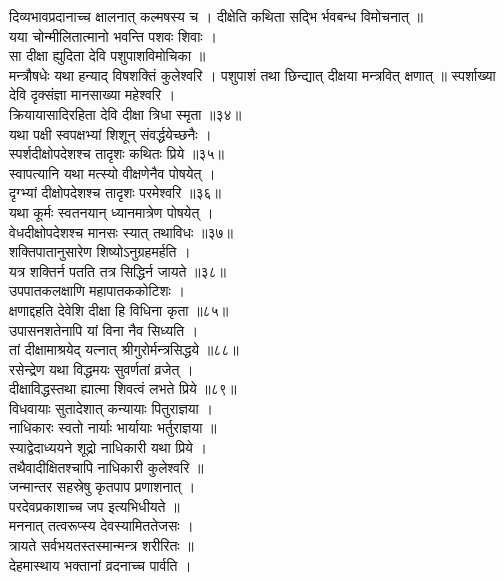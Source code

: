दिव्यभावप्रदानाच्च क्षालनात् कल्मषस्य च । 
दीक्षेति कथिता सद्भि र्भवबन्ध विमोचनात् ॥\\
यया चोन्मीलितात्मानो भवन्ति पशवः शिवाः ।\\[-2mm]
सा दीक्षा ह्युदिता देवि पशुपाशविमोचिका ॥\\
मन्त्रौषधेः यथा हन्याद् विषशक्तिं कुलेश्वरि । 
पशुपाशं तथा छिन्द्यात् दीक्षया मन्त्रवित् क्षणात् ॥ 
स्पर्शाख्या देवि दृक्संज्ञा मानसाख्या महेश्वरि ।\\[-2mm]
क्रियायासादिरहिता देवि दीक्षा त्रिधा स्मृता ॥३४॥\\  
यथा पक्षी स्वपक्षभ्यां शिशून् संवर्द्धयेच्छनैः ।\\[-2mm]
स्पर्शदीक्षोपदेशश्च तादृशः कथितः प्रिये ॥३५॥\\
स्वापत्यानि यथा मत्स्यो वीक्षणेनैव पोषयेत् ।\\[-2mm]
दृग्भ्यां दीक्षोपदेशश्च तादृशः परमेश्वरि ॥३६॥\\
यथा कूर्मः स्वतनयान् ध्यानमात्रेण पोषयेत् ।\\[-2mm]
वेधदीक्षोपदेशश्च मानसः स्यात् तथाविधः ॥३७॥\\
शक्तिपातानुसारेण शिष्योऽनुग्रहमर्हति ।\\[-2mm]
यत्र शक्तिर्न पतति तत्र सिद्धिर्न जायते ॥३८॥\\
उपपातकलक्षाणि महापातककोटिशः ।\\[-2mm]
क्षणाद्दहति देवेशि दीक्षा हि विधिना कृता ॥८५॥\\
उपासनशतेनापि यां विना नैव सिध्यति ।\\[-2mm]
तां दीक्षामाश्रयेद् यत्नात् श्रीगुरोर्मन्त्रसिद्धये ॥८८॥\\
रसेन्द्रेण यथा विद्धमयः सुवर्णतां व्रजेत् ।\\[-2mm]
दीक्षाविद्धस्तथा ह्यात्मा शिवत्वं लभते प्रिये ॥८९॥\\
विधवायाः सुतादेशात् कन्यायाः पितुराज्ञया ।\\[-2mm]
नाधिकारः स्वतो नार्याः भार्यायाः भर्तुराज्ञया ॥\\
स्याद्वेदाध्ययने शूद्रो नाधिकारी यथा प्रिये ।\\[-2mm]
तथैवादीक्षितश्चापि नाधिकारी कुलेश्वरि ॥\\
जन्मान्तर सहस्रेषु कृतपाप प्रणाशनात् ।\\[-2mm]
परदेवप्रकाशाच्च जप इत्यभिधीयते ॥\\
मननात् तत्वरूप्स्य देवस्यामिततेजसः ।\\[-2mm]
त्रायते सर्वभयतस्तस्मान्मन्त्र शरीरितः ॥\\
देहमास्थाय भक्तानां व्रदनाच्च पार्वति ।\\[-2mm]

